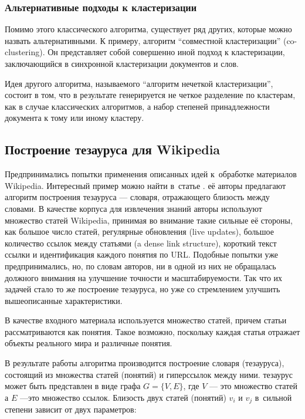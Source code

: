 \subsubsection{Альтернативные подходы к кластеризации}

Помимо этого классического алгоритма, существует ряд других, которые можно назвать альтернативными.
К примеру, алгоритм ``совместной кластеризации'' (co-clustering). 
Он представляет собой совершенно
иной подход к кластеризации, заключающийся в синхронной кластеризации документов и слов.

Идея другого алгоритма, называемого ``алгоритм нечеткой кластеризации'', состоит в том, что в результате
генерируется не четкое разделение по кластерам, как в случае классических алгоритмов, а набор степеней принадлежности
документа к тому или иному кластеру.

\subsection{Построение тезауруса для Wikipedia}

Предпринимались попытки применения описанных идей к~обработке материалов Wikipedia.
Интересный пример можно найти в~статье \cite{thesaurus}.
её авторы предлагают алгоритм построения тезауруса --- словаря, отражающего близость между словами.
В качестве корпуса для извлечения знаний авторы используют множество статей Wikipedia,
принимая во внимание такие сильные её стороны, как большое число 
статей, регулярные обновления (live updates), большое количество ссылок между статьями 
(a dense link structure), короткий текст ссылки и идентификация каждого понятия по URL.
Подобные попытки уже предпринимались, но, по словам авторов, ни в одной из них не обращалась
должного внимания на улучшение точности и масштабируемости. Так что их задачей стало то же 
построение тезауруса, но уже со стремлением улучшить вышеописанные характеристики.

В качестве входного материала используется множество статей, причем статьи рассматриваются как понятия. 
Такое возможно, поскольку каждая статья отражает объекты реального мира и различные понятия.

В результате работы алгоритма производится построение словаря (тезауруса), состоящий из множества статей (понятий) и гиперссылок между ними.
тезаурус может быть представлен в виде графа $G = \{V,E\}$, где 
$V$  --- это множество статей
а $E$ ---это множество ссылок.
Близость двух статей (понятий) $v_i$ и $v_j$  в~сильной степени зависит от двух параметров:

